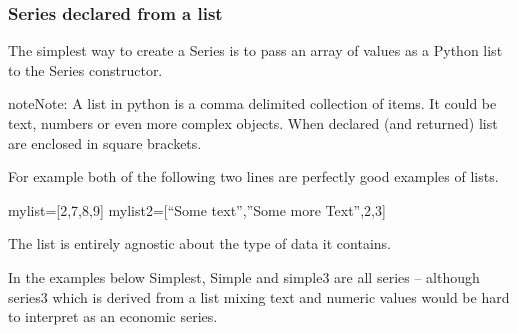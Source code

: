 \documentclass[letterpaper,10pt,english]{jupyterBook}
\begin{document}
\subsubsection{Series declared from a list}
\label{\detokenize{content/04_PythonEssentials/PythonPandasDataframes:series-declared-from-a-list}}
\sphinxAtStartPar
The simplest way to create a Series is to pass an array of values as a Python list to the Series constructor.

\begin{sphinxadmonition}{note}{Note:}
\sphinxAtStartPar
A list in python is a comma delimited collection of items.  It could be text, numbers or even more complex objects.  When declared (and returned) list are enclosed in square brackets.

\sphinxAtStartPar
For example both of the following two lines are perfectly good examples of lists.

\sphinxAtStartPar
mylist={[}2,7,8,9{]}
mylist2={[}“Some text”,”Some more Text”,2,3{]}

\sphinxAtStartPar
The list is entirely agnostic about the type of data it contains.
\end{sphinxadmonition}

\sphinxAtStartPar
In the examples below Simplest, Simple and simple3 are all series – although series3 which is derived from a list mixing text and numeric values would be hard to interpret as an economic series.
\end{document}
